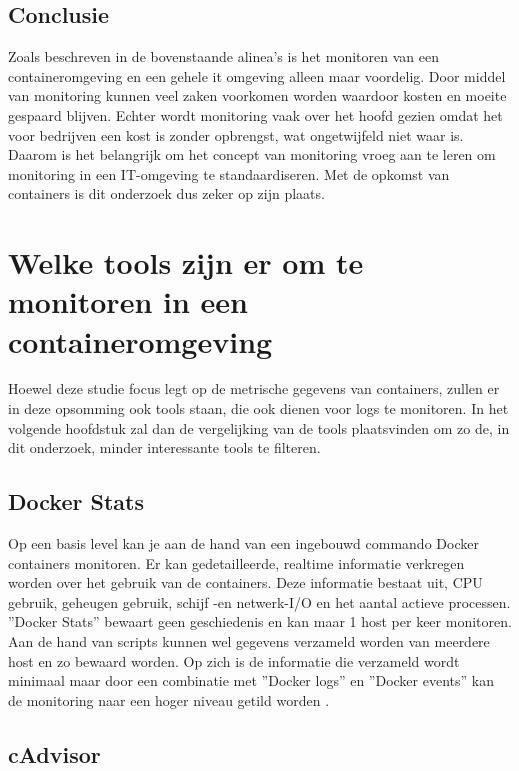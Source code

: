 \subsection{Conclusie}

Zoals beschreven in de bovenstaande alinea's is het monitoren van een containeromgeving en een gehele it omgeving alleen maar voordelig.  Door middel van monitoring kunnen veel zaken voorkomen worden waardoor kosten en moeite gespaard blijven. Echter wordt monitoring vaak over het hoofd gezien omdat het voor bedrijven een kost is zonder opbrengst, wat ongetwijfeld niet waar is. Daarom is het belangrijk om het concept van monitoring vroeg aan te leren om monitoring in een IT-omgeving te standaardiseren. Met de opkomst van containers is dit onderzoek dus zeker op zijn plaats.

\section{Welke tools zijn er om te monitoren in een containeromgeving}

Hoewel deze studie focus legt op de metrische gegevens van containers, zullen er in deze opsomming ook tools staan, die ook dienen voor logs te monitoren. In het volgende hoofdstuk zal dan de vergelijking van de tools plaatsvinden om zo de, in dit onderzoek, minder interessante tools te filteren.

\subsection{Docker Stats}

Op een basis level kan je aan de hand van een ingebouwd commando Docker containers monitoren. Er kan gedetailleerde, realtime informatie verkregen worden over het gebruik van de containers. Deze informatie bestaat uit, CPU gebruik, geheugen gebruik, schijf -en netwerk-I/O en het aantal actieve processen. ''Docker Stats'' bewaart geen geschiedenis en kan maar 1 host per keer monitoren. Aan de hand van scripts kunnen wel gegevens verzameld worden van meerdere host en zo bewaard worden. Op zich is de informatie die verzameld wordt minimaal maar door een combinatie met ''Docker logs'' en ''Docker events''  kan de monitoring naar een hoger niveau getild worden \autocite{Sissons2021}.  

\subsection{cAdvisor}

